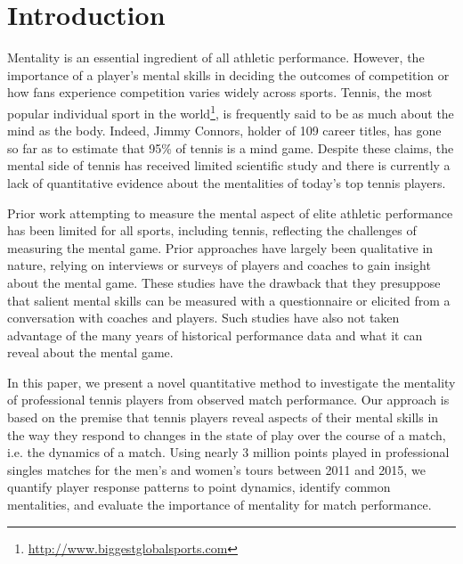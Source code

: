 \documentclass{Latex/svjour3}
\begin{document}
\section{Introduction}

Mentality is an essential ingredient of all athletic performance. However, the
importance of a player's mental skills in deciding the outcomes of competition
or how fans experience competition varies widely across sports. Tennis, the most
popular individual sport in the
world\footnote{\url{http://www.biggestglobalsports.com}}, is frequently said to
be as much about the mind as the body. Indeed, Jimmy Connors, holder of 109
career titles, has gone so far as to estimate that 95\% of tennis is a mind
game\cite{samulski2007tennis}. Despite these claims, the mental side of tennis
has received limited scientific study and there is currently a lack of
quantitative evidence about the mentalities of today's top tennis players.

Prior work attempting to measure the mental aspect of elite athletic performance
has been limited for all sports, including tennis, reflecting the challenges of
measuring the mental game. Prior approaches have largely been qualitative in
nature, relying on interviews\cite{young2011understanding} or
surveys\cite{taylor1987predicting} of players and coaches to gain insight about
the mental game. These studies have the drawback that they presuppose that
salient mental skills can be measured with a questionnaire or elicited from a
conversation with coaches and players. Such studies have also not taken
advantage of the many years of historical performance data and what it can
reveal about the mental game. 

In this paper, we present a novel quantitative method to investigate the
mentality of professional tennis players from observed match performance. Our
approach is based on the premise that tennis players reveal aspects of their
mental skills in the way they respond to changes in the state of play over the
course of a match, i.e. the dynamics of a match. Using nearly 3 million points
played in professional singles matches for the men's and women's tours between
2011 and 2015, we quantify player response patterns to point dynamics, identify
common mentalities, and evaluate the importance of mentality for match
performance.
\end{document}
